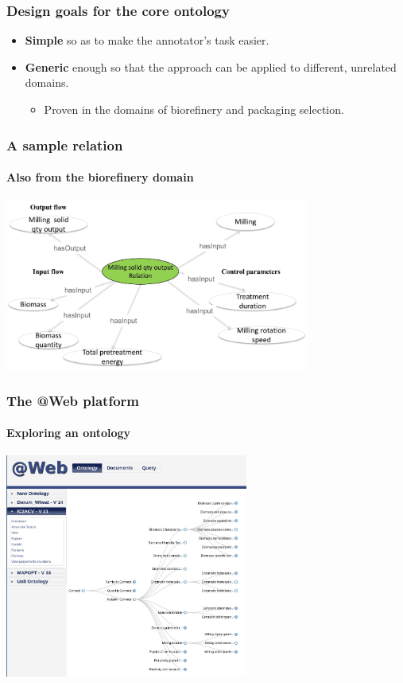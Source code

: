 \documentclass{beamer}
\begin{document}
\begin{frame}
  \frametitle{Design goals for the core ontology}

  \begin{itemize}
    \item \textbf{Simple} so as to make the annotator's task easier.

    \pause

    \item \textbf{Generic} enough so that the approach can be applied to
      different, unrelated domains.

    \pause

    \begin{itemize}
      \item Proven in the domains of biorefinery and packaging selection.
    \end{itemize}
  \end{itemize}
\end{frame}

\begin{frame}
  \frametitle{A sample relation}
  \framesubtitle{Also from the biorefinery domain}

  \begin{center}
    \includegraphics[width=10cm]{relation.jpg}
  \end{center}
\end{frame}

\begin{frame}
  \frametitle{The \textbf{@Web} platform}
  \framesubtitle{Exploring an ontology}

  \begin{center}
    \includegraphics[width=8cm]{atweb-ontology.jpg}
  \end{center}
\end{frame}
\end{document}
